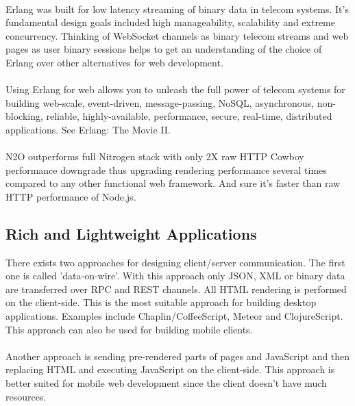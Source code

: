 
\paragraph{}
Erlang was built for low latency streaming of binary data in telecom systems.
It's fundamental design goals included high manageability, scalability
and extreme concurrency. Thinking of WebSocket channels as binary
telecom streams and web pages as user binary sessions
helps to get an understanding of the choice
of Erlang over other alternatives for web development.

\paragraph{}
Using Erlang for web allows you to unleash the full power of telecom systems for
building web-scale, event-driven, message-passing, NoSQL, asynchronous, non-blocking,
reliable, highly-available, performance, secure, real-time, distributed applications.
See Erlang: The Movie II.

\paragraph{}
N2O outperforms full Nitrogen stack with only 2X raw HTTP Cowboy
performance downgrade thus upgrading rendering performance several
times compared to any other functional web framework. And
sure it's faster than raw HTTP performance of Node.js.

\subsection{Rich and Lightweight Applications}
There exists two approaches for designing client/server communication.
The first one is called 'data-on-wire'. With this approach only JSON, XML or binary
data are transferred over RPC and REST channels. All HTML rendering
is performed on the client-side. This is the most suitable approach for building desktop
applications. Examples include Chaplin/CoffeeScript, Meteor
and ClojureScript. This approach can also be used for building mobile clients.

\paragraph{}
Another approach is sending pre-rendered parts of pages and JavaScript
and then replacing HTML and executing JavaScript on the client-side. This approach
is better suited for mobile web development since the
client doesn't have much resources.

